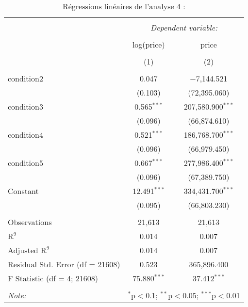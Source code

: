 \documentclass[
  11pt,
  french,
]{article}
\begin{document}
\begin{table}[!htbp] \centering 
  \caption{Régressions linéaires de l'analyse 4 :} 
  \label{} 
\small 
\begin{tabular}{@{\extracolsep{1pt}}lcc} 
\\[-1.8ex]\hline 
\hline \\[-1.8ex] 
 & \multicolumn{2}{c}{\textit{Dependent variable:}} \\ 
\cline{2-3} 
\\[-1.8ex] & log(price) & price \\ 
\\[-1.8ex] & (1) & (2)\\ 
\hline \\[-1.8ex] 
 condition2 & 0.047 & $-$7,144.521 \\ 
  & (0.103) & (72,395.060) \\ 
  condition3 & 0.565$^{***}$ & 207,580.900$^{***}$ \\ 
  & (0.096) & (66,874.610) \\ 
  condition4 & 0.521$^{***}$ & 186,768.700$^{***}$ \\ 
  & (0.096) & (66,979.450) \\ 
  condition5 & 0.667$^{***}$ & 277,986.400$^{***}$ \\ 
  & (0.096) & (67,389.750) \\ 
  Constant & 12.491$^{***}$ & 334,431.700$^{***}$ \\ 
  & (0.095) & (66,803.230) \\ 
 \hline \\[-1.8ex] 
Observations & 21,613 & 21,613 \\ 
R$^{2}$ & 0.014 & 0.007 \\ 
Adjusted R$^{2}$ & 0.014 & 0.007 \\ 
Residual Std. Error (df = 21608) & 0.523 & 365,896.400 \\ 
F Statistic (df = 4; 21608) & 75.880$^{***}$ & 37.412$^{***}$ \\ 
\hline 
\hline \\[-1.8ex] 
\textit{Note:}  & \multicolumn{2}{r}{$^{*}$p$<$0.1; $^{**}$p$<$0.05; $^{***}$p$<$0.01} \\ 
\end{tabular} 
\end{table}
\end{document}
